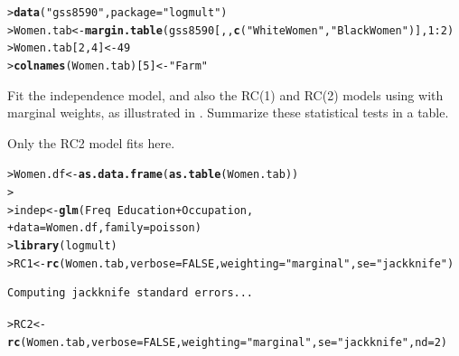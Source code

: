 \documentclass[10pt]{report}\usepackage[]{graphicx}\usepackage[]{color}
\makeatletter
\newcommand{\hlnum}[1]{\textcolor[rgb]{0.686,0.059,0.569}{#1}}%
\newcommand{\hlstr}[1]{\textcolor[rgb]{0.192,0.494,0.8}{#1}}%
\newcommand{\hlopt}[1]{\textcolor[rgb]{0,0,0}{#1}}%
\newcommand{\hlstd}[1]{\textcolor[rgb]{0.345,0.345,0.345}{#1}}%
\newcommand{\hlkwb}[1]{\textcolor[rgb]{0.69,0.353,0.396}{#1}}%
\newcommand{\hlkwc}[1]{\textcolor[rgb]{0.333,0.667,0.333}{#1}}%
\newcommand{\hlkwd}[1]{\textcolor[rgb]{0.737,0.353,0.396}{\textbf{#1}}}%
\newenvironment{kframe}{%
 \def\at@end@of@kframe{}%
 \ifinner\ifhmode%
  \def\at@end@of@kframe{\end{minipage}}%
  \begin{minipage}{\columnwidth}%
 \fi\fi%
 \def\FrameCommand##1{\hskip\@totalleftmargin \hskip-\fboxsep
 \colorbox{shadecolor}{##1}\hskip-\fboxsep
     \hskip-\linewidth \hskip-\@totalleftmargin \hskip\columnwidth}%
 \MakeFramed {\advance\hsize-\width
   \@totalleftmargin\z@ \linewidth\hsize
   \@setminipage}}%
 {\par\unskip\endMakeFramed%
 \at@end@of@kframe}
\newenvironment{knitrout}{}{} %
\renewenvironment{knitrout}{\small\renewcommand{\baselinestretch}{.85}}{} %
\makeatother
\begin{document}
\begin{Exercises}
\begin{knitrout}\footnotesize
{}\color{fgcolor}\begin{kframe}
\begin{alltt}
\hlstd{> }\hlkwd{data}\hlstd{(}\hlstr{"gss8590"}\hlstd{,} \hlkwc{package}\hlstd{=}\hlstr{"logmult"}\hlstd{)}
\hlstd{> }\hlstd{Women.tab} \hlkwb{<-} \hlkwd{margin.table}\hlstd{(gss8590[,,}\hlkwd{c}\hlstd{(}\hlstr{"White Women"}\hlstd{,} \hlstr{"Black Women"}\hlstd{)],} \hlnum{1}\hlopt{:}\hlnum{2}\hlstd{)}
\hlstd{> }\hlstd{Women.tab[}\hlnum{2}\hlstd{,}\hlnum{4}\hlstd{]} \hlkwb{<-} \hlnum{49}
\hlstd{> }\hlkwd{colnames}\hlstd{(Women.tab)[}\hlnum{5}\hlstd{]} \hlkwb{<-} \hlstr{"Farm"}
\end{alltt}
\end{kframe}
\end{knitrout}
  \begin{enumerate*}
    \item Fit the independence model, and also the RC(1) and RC(2) models using
     with marginal weights, as illustrated in .
    Summarize these statistical tests in a table.
    \begin{ans}
    Only the RC2 model fits here.
\begin{knitrout}\footnotesize
{}\color{fgcolor}\begin{kframe}
\begin{alltt}
\hlstd{> }\hlstd{Women.df} \hlkwb{<-} \hlkwd{as.data.frame}\hlstd{(}\hlkwd{as.table}\hlstd{(Women.tab))}
\hlstd{> }
\hlstd{> }\hlstd{indep} \hlkwb{<-} \hlkwd{glm}\hlstd{(Freq} \hlopt{~} \hlstd{Education} \hlopt{+} \hlstd{Occupation,}
\hlstd{+ }             \hlkwc{data} \hlstd{= Women.df,} \hlkwc{family} \hlstd{= poisson)}
\hlstd{> }\hlkwd{library}\hlstd{(logmult)}
\hlstd{> }\hlstd{RC1} \hlkwb{<-} \hlkwd{rc}\hlstd{(Women.tab,} \hlkwc{verbose}\hlstd{=}\hlnum{FALSE}\hlstd{,} \hlkwc{weighting}\hlstd{=}\hlstr{"marginal"}\hlstd{,} \hlkwc{se}\hlstd{=}\hlstr{"jackknife"}\hlstd{)}
\end{alltt}
\begin{verbatim}
Computing jackknife standard errors...
\end{verbatim}
\begin{alltt}
\hlstd{> }\hlstd{RC2} \hlkwb{<-} \hlkwd{rc}\hlstd{(Women.tab,} \hlkwc{verbose}\hlstd{=}\hlnum{FALSE}\hlstd{,} \hlkwc{weighting}\hlstd{=}\hlstr{"marginal"}\hlstd{,} \hlkwc{se}\hlstd{=}\hlstr{"jackknife"}\hlstd{,} \hlkwc{nd}\hlstd{=}\hlnum{2}\hlstd{)}

\end{alltt}
\end{kframe}
\end{knitrout}
\end{ans}
\end{enumerate*}
\end{Exercises}
\end{document}
